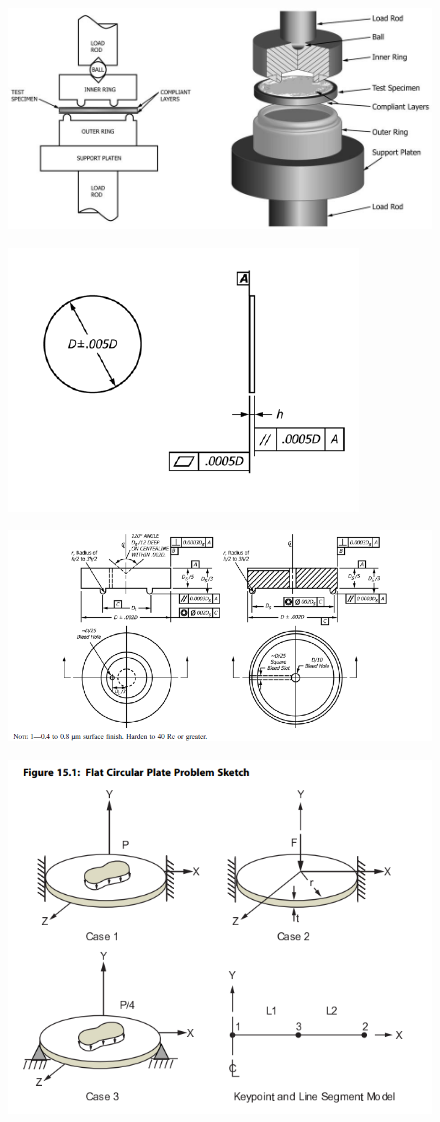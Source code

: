 \documentclass[10pt,letterpaper]{report}
\numberwithin{equation}{chapter}
\begin{document}
\begin{figure}[!h]
\centering
\includegraphics[width=0.7\linewidth]{./BD_3}
\caption{}
\label{fig:BD_3}
\end{figure}
\begin{figure}[!h]
\centering
\includegraphics[width=0.7\linewidth]{./BD_2}
\caption{}
\label{fig:BD_2}
\end{figure}
\begin{figure}[!h]
\centering
\includegraphics[width=0.7\linewidth]{./BD_1}
\caption{}
\label{fig:BD_1}
\end{figure}
\begin{figure}[!h]
\centering
\includegraphics[width=0.7\linewidth]{./BD_4}
\caption{}
\label{fig:BD_4}
\end{figure}
\end{document}
